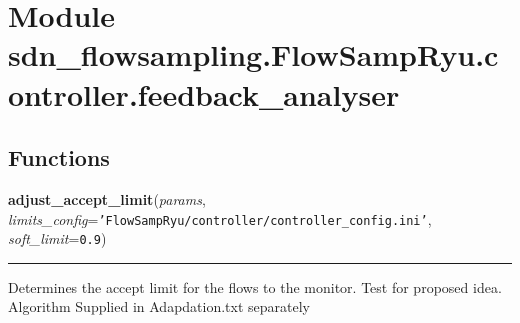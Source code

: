 %
%
%


\section{Module sdn\_flowsampling.FlowSampRyu.controller.feedback\_analyser}

    \label{sdn_flowsampling:FlowSampRyu:controller:feedback_analyser}


  \subsection{Functions}

    \label{sdn_flowsampling:FlowSampRyu:controller:feedback_analyser:adjust_accept_limit}

    \vspace{0.5ex}

\hspace{.8\funcindent}\begin{boxedminipage}{\funcwidth}

    \raggedright \textbf{adjust\_accept\_limit}(\textit{params}, \textit{limits\_config}={\tt \texttt{'}\texttt{FlowSampRyu/controller/controller\_config.ini}\texttt{'}}, \textit{soft\_limit}={\tt 0.9})

    \vspace{-1.5ex}

    \rule{\textwidth}{0.5\fboxrule}
\setlength{\parskip}{2ex}
    Determines the accept limit for the flows to the monitor. Test for 
    proposed idea. Algorithm Supplied in Adapdation.txt separately

\setlength{\parskip}{1ex}
    \end{boxedminipage}


